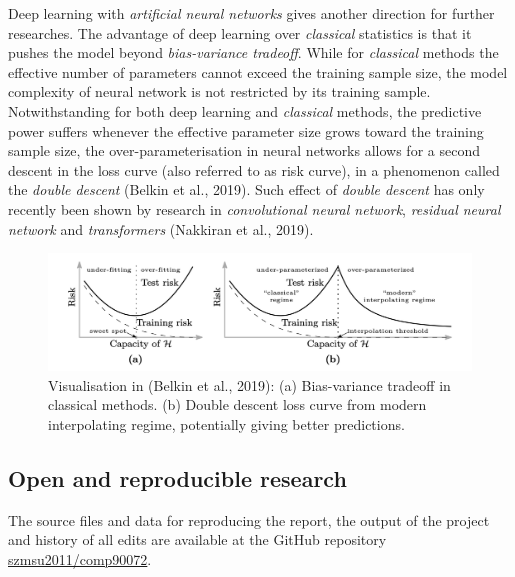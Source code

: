 \documentclass[
]{article}
\begin{document}
Deep learning with \emph{artificial neural networks} gives another
direction for further researches. The advantage of deep learning over
\emph{classical} statistics is that it pushes the model beyond
\emph{bias-variance tradeoff}. While for \emph{classical} methods the
effective number of parameters cannot exceed the training sample size,
the model complexity of neural network is not restricted by its training
sample. Notwithstanding for both deep learning and \emph{classical}
methods, the predictive power suffers whenever the effective parameter
size grows toward the training sample size, the over-parameterisation in
neural networks allows for a second descent in the loss curve (also
referred to as risk curve), in a phenomenon called the \emph{double
descent} (Belkin et al., 2019). Such effect of \emph{double descent} has
only recently been shown by research in \emph{convolutional neural
network}, \emph{residual neural network} and \emph{transformers}
(Nakkiran et al., 2019).

\begin{figure}

{\centering \includegraphics[width=1\linewidth]{figure/ddd} 

}

\caption{Visualisation in (Belkin et al., 2019): (a) Bias-variance tradeoff in classical methods. (b) Double descent loss curve from modern interpolating regime, potentially giving better predictions.}\label{fig:ddd}
\end{figure}

\hypertarget{open-and-reproducible-research}{%
\subsection{Open and reproducible
research}\label{open-and-reproducible-research}}

The source files and data for reproducing the report, the output of the
project and history of all edits are available at the GitHub repository
\href{https://github.com/szmsu2011/comp90072}{szmsu2011/comp90072}.

\newpage
\end{document}
